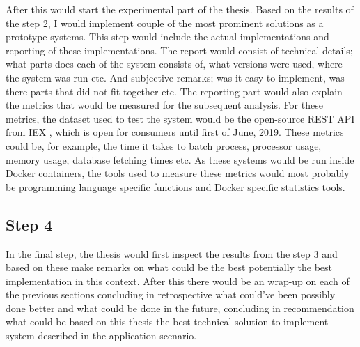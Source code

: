 \documentclass[article,11pt]{article}
\begin{document}
After this would start the experimental part of the thesis.
Based on the results of the step 2, I would implement couple of the most prominent solutions as a prototype systems.
This step would include the actual implementations and reporting of these implementations.
The report would consist of technical details; what parts does each of the system consists of, what versions were used, where the system was run etc. And subjective remarks; was it easy to implement, was there parts that did not fit together etc. 
The reporting part would also explain the metrics that would be measured for the subsequent analysis.
For these metrics, the dataset used to test the system would be the open-source REST API from IEX \cite{iex}, which is open for consumers until first of June, 2019.
These metrics could be, for example, the time it takes to batch process, processor usage, memory usage, database fetching times etc. 
As these systems would be run inside Docker containers, the tools used to measure these metrics would most probably be programming language specific functions and Docker specific statistics tools. 

\subsection*{Step 4}

In the final step, the thesis would first inspect the results from the step 3 and based on these make remarks on what could be the best potentially the best implementation in this context.
After this there would be an wrap-up on each of the previous sections concluding in retrospective what could've been possibly done better and what could be done in the future, concluding in recommendation what could be based on this thesis the best technical solution to implement system described in the application scenario. 


\printbibliography
\end{document}
